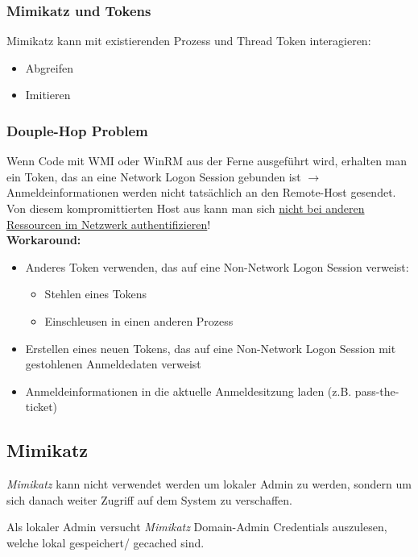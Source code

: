 \subsubsection{Mimikatz und Tokens}
Mimikatz kann mit existierenden Prozess und Thread Token interagieren:
\begin{itemize}
    \item Abgreifen
    \item Imitieren
\end{itemize}

\subsubsection{Douple-Hop Problem}
Wenn Code mit WMI oder WinRM aus der Ferne ausgeführt wird, erhalten man ein Token, das an eine Network Logon Session gebunden ist $\rightarrow$ Anmeldeinformationen werden nicht tatsächlich an den Remote-Host gesendet.\\
Von diesem kompromittierten Host aus kann man sich \underline{nicht bei anderen Ressourcen im Netzwerk authentifizieren}!\\

\textbf{Workaround:}
\begin{itemize}
    \item Anderes Token verwenden, das auf eine Non-Network Logon Session verweist:
    \begin{itemize}
        \item Stehlen eines Tokens
        \item Einschleusen in einen anderen Prozess
    \end{itemize}
    \item Erstellen eines neuen Tokens, das auf eine Non-Network Logon Session mit gestohlenen Anmeldedaten verweist
    \item Anmeldeinformationen in die aktuelle Anmeldesitzung laden (z.B. pass-the-ticket)
\end{itemize}

\subsection{Mimikatz}
\textit{Mimikatz} kann nicht verwendet werden um lokaler Admin zu werden, sondern um sich danach weiter Zugriff auf dem System zu verschaffen.

Als lokaler Admin versucht \textit{Mimikatz} Domain-Admin Credentials auszulesen, welche lokal gespeichert/ gecached sind.

